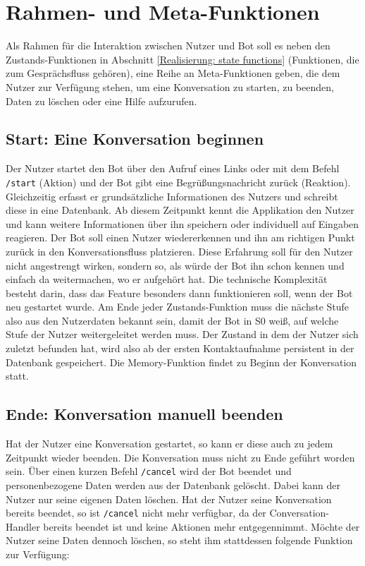     
    \section{Rahmen- und Meta-Funktionen} \label{Realisierung: meta functions}
        Als Rahmen für die Interaktion zwischen Nutzer und Bot soll es neben den Zustands-Funktionen in Abschnitt \ref*{Realisierung: state functions} (Funktionen, die zum Gesprächsfluss gehören), eine Reihe an Meta-Funktionen geben, die dem Nutzer zur Verfügung stehen, um eine Konversation zu starten, zu beenden, Daten zu löschen oder eine Hilfe aufzurufen.
            
        \subsection{Start: Eine Konversation beginnen}
            Der Nutzer startet den Bot über den Aufruf eines Links oder mit dem Befehl \verb|/start| (Aktion) und der Bot gibt eine Begrüßungsnachricht zurück (Reaktion). Gleichzeitig erfasst er grundsätzliche Informationen des Nutzers und schreibt diese in eine Datenbank. Ab diesem Zeitpunkt kennt die Applikation den Nutzer und kann weitere Informationen über ihn speichern oder individuell auf Eingaben reagieren. Der Bot soll einen Nutzer wiedererkennen und ihn am richtigen Punkt zurück in den Konversationsfluss platzieren. Diese Erfahrung soll für den Nutzer nicht angestrengt wirken, sondern so, als würde der Bot ihn schon kennen und einfach da weitermachen, wo er aufgehört hat. Die technische Komplexität besteht darin, dass das Feature besonders dann funktionieren soll, wenn der Bot neu gestartet wurde. Am Ende jeder Zustands-Funktion muss die nächste Stufe also aus den Nutzerdaten bekannt sein, damit der Bot in S0 weiß, auf welche Stufe der Nutzer weitergeleitet werden muss. Der Zustand in dem der Nutzer sich zuletzt befunden hat, wird also ab der ersten Kontaktaufnahme persistent in der Datenbank gespeichert. Die Memory-Funktion findet zu Beginn der Konversation statt. 
        
        \subsection{Ende: Konversation manuell beenden}
            Hat der Nutzer eine Konversation gestartet, so kann er diese auch zu jedem Zeitpunkt wieder beenden. Die Konversation muss nicht zu Ende geführt worden sein. Über einen kurzen Befehl \verb|/cancel| wird der Bot beendet und personenbezogene Daten werden aus der Datenbank gelöscht. Dabei kann der Nutzer nur seine eigenen Daten löschen. Hat der Nutzer seine Konversation bereits beendet, so ist \verb|/cancel| nicht mehr verfügbar, da der Conversation-Handler bereits beendet ist und keine Aktionen mehr entgegennimmt. Möchte der Nutzer seine Daten dennoch löschen, so steht ihm stattdessen folgende Funktion zur Verfügung: 
        
